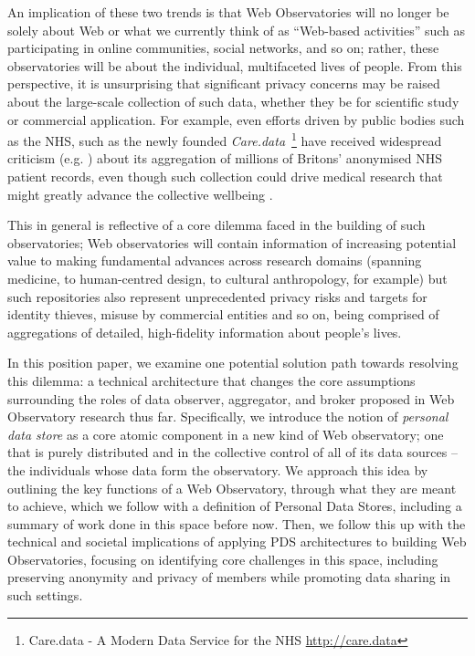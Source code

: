 \documentclass{sig-alternate}
\begin{document}
An implication of these two trends is that Web Observatories will no longer be solely about Web or what we currently think of as ``Web-based activities'' such as participating in online communities, social networks, and so on; rather, these observatories will be about the individual, multifaceted lives of people. From this perspective, it is unsurprising that significant privacy concerns may be raised about the large-scale collection of such data, whether they be for scientific study or commercial application. For example, even efforts driven by public bodies such as the NHS, such as the newly founded \emph{Care.data}~\footnote{Care.data - A Modern Data Service for the NHS \url{http://care.data}} have received widespread criticism (e.g. \cite{RameshNHS}) about its aggregation of millions of Britons' anonymised NHS patient records, even though such collection could drive medical research that might greatly advance the collective wellbeing \cite{de2006use}.

This in general is reflective of a core dilemma faced in the building of such observatories; Web observatories will contain information of increasing potential value to making fundamental advances across research domains (spanning medicine, to human-centred design, to cultural anthropology, for example) but such repositories also represent unprecedented privacy risks and targets for identity thieves, misuse by commercial entities and so on, being comprised of aggregations of detailed, high-fidelity information about people's lives. 

In this position paper, we examine one potential solution path towards resolving this dilemma: a technical architecture that changes the core assumptions surrounding the roles of data observer, aggregator, and broker proposed in Web Observatory research thus far. Specifically, we introduce the notion of \emph{personal data store} as a core atomic component in a new kind of Web observatory; one that is purely distributed and in the collective control of all of its data sources -- the individuals whose data form the observatory.  We approach this idea by outlining the key functions of a Web Observatory, through what they are meant to achieve, which we follow with a definition of Personal Data Stores, including a summary of work done in this space before now. Then, we follow this up with the technical and societal implications of applying PDS architectures to building Web Observatories, focusing on identifying core challenges in this space, including preserving anonymity and privacy of members while promoting data sharing in such settings.
\end{document}

